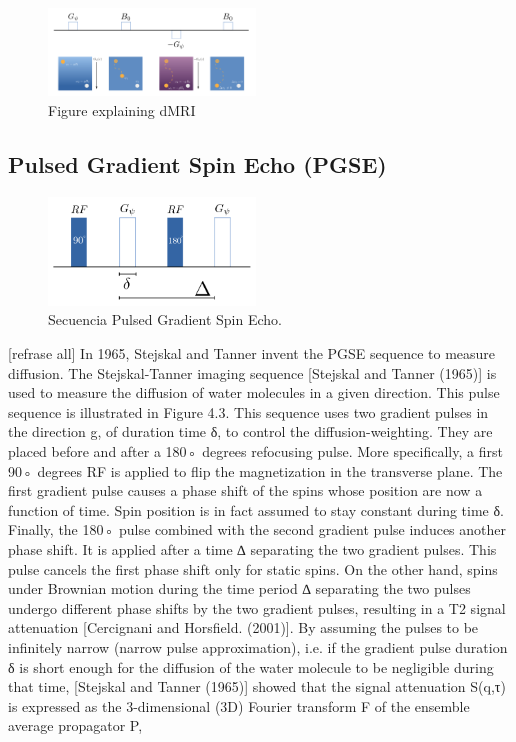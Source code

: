 \begin{figure}
    \includegraphics[width=0.49\textwidth]{3.mri/img/dmri.png}
    \caption{Figure explaining dMRI}
    \label{fig:}
\end{figure}  

\subsection{Pulsed Gradient Spin Echo (PGSE)}
\begin{figure}
    \includegraphics[width=0.49\textwidth]{3.mri/img/fgp.png}
    \caption{Secuencia Pulsed Gradient Spin Echo.}
    \label{fig:fgp}
\end{figure}  

[refrase all]
In 1965, Stejskal and Tanner invent the PGSE sequence to measure diffusion. 
The Stejskal-Tanner imaging sequence [Stejskal and Tanner (1965)] is used to
measure the diffusion of water molecules in a given direction. This pulse
sequence is illustrated in Figure 4.3. This sequence uses two gradient pulses
in the direction g, of duration time δ, to control the diffusion-weighting.
They are placed before and after a 180◦ degrees refocusing pulse.
More specifically, a first 90◦ degrees RF is applied to flip the magnetization
in the transverse plane. The first gradient pulse causes a phase shift of the
spins whose position are now a function of time. Spin position is in fact
assumed to stay constant during time δ. Finally, the 180◦ pulse combined with
the second gradient pulse induces another phase shift. It is applied after a time
∆ separating the two gradient pulses. This pulse cancels the first phase
shift only for static spins. On the other hand, spins under Brownian motion during
the time period ∆ separating the two pulses undergo different phase shifts by
the two gradient pulses, resulting in a T2 signal attenuation [Cercignani and Horsfield. (2001)].
By assuming the pulses to be infinitely narrow (narrow pulse approximation), i.e.
if the gradient pulse duration δ is short enough for the diffusion of the water molecule
to be negligible during that time, [Stejskal and Tanner (1965)] showed that the signal
attenuation S(q,τ) is expressed as the 3-dimensional (3D) Fourier transform
F of the ensemble average propagator P,

